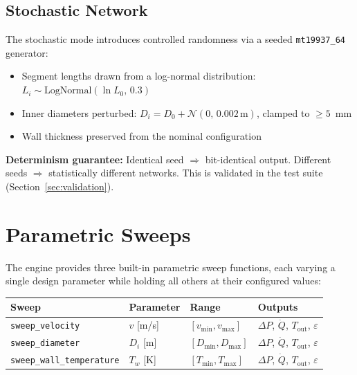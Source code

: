 \documentclass[11pt]{article}
\begin{document}
\subsection{Stochastic Network}

The stochastic mode introduces controlled randomness via a seeded
\texttt{mt19937\_64} generator:

\begin{itemize}
  \item Segment lengths drawn from a log-normal distribution:
        $L_i \sim \text{LogNormal}(\ln L_0, \, 0.3)$
  \item Inner diameters perturbed:
        $D_i = D_0 + \mathcal{N}(0, \, 0.002\,\text{m})$, clamped to $\geq 5$~mm
  \item Wall thickness preserved from the nominal configuration
\end{itemize}

\noindent
\textbf{Determinism guarantee:} Identical seed $\Rightarrow$ bit-identical
output.  Different seeds $\Rightarrow$ statistically different networks.
This is validated in the test suite (Section~\ref{sec:validation}).

\section{Parametric Sweeps}

The engine provides three built-in parametric sweep functions, each
varying a single design parameter while holding all others at their
configured values:

\begin{center}
\begin{tabular}{llll}
\toprule
Sweep & Parameter & Range & Outputs \\
\midrule
\texttt{sweep\_velocity}         & $v$ [m/s]   & $[v_{\min}, v_{\max}]$ & $\Delta P$, $\dot{Q}$, $T_{\text{out}}$, $\varepsilon$ \\
\texttt{sweep\_diameter}         & $D_i$ [m]   & $[D_{\min}, D_{\max}]$ & $\Delta P$, $\dot{Q}$, $T_{\text{out}}$, $\varepsilon$ \\
\texttt{sweep\_wall\_temperature} & $T_w$ [K]  & $[T_{\min}, T_{\max}]$ & $\Delta P$, $\dot{Q}$, $T_{\text{out}}$, $\varepsilon$ \\
\bottomrule
\end{tabular}
\end{center}
\end{document}
